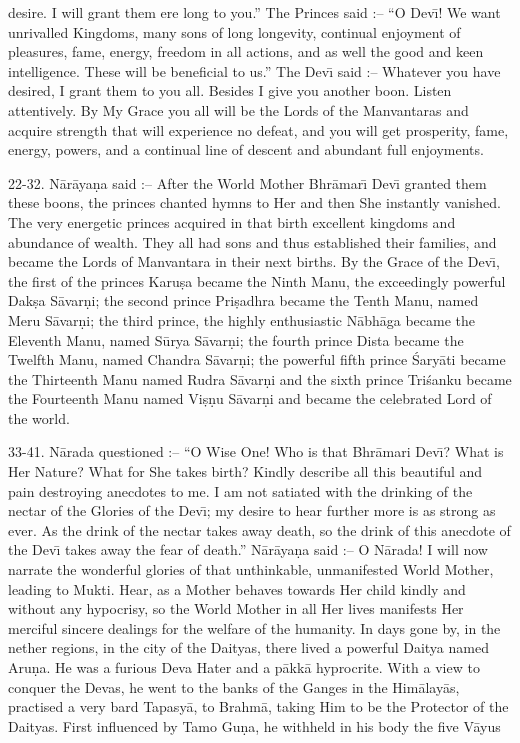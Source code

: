 desire. I will grant them ere long to you.'' The Princes said :-- ``O Dev\={\i}! We want unrivalled Kingdoms, many sons of long longevity, continual enjoyment of pleasures, fame, energy, freedom in all actions, and as well the good and keen intelligence. These will be beneficial to us.'' The Dev\={\i} said :-- Whatever you have desired, I grant them to you all. Besides I give you another boon. Listen attentively. By My Grace you all will be the Lords of the Manvantaras and acquire strength that will experience no defeat, and you will get prosperity, fame, energy, powers, and a continual line of descent and abundant full enjoyments.

22-32. N\=ar\=aya\d{n}a said :-- After the World Mother Bhr\=amar\={\i} Dev\={\i} granted them these boons, the princes chanted hymns to Her and then She instantly vanished. The very energetic princes acquired in that birth excellent kingdoms and abundance of wealth. They all had sons and thus established their families, and became the Lords of Manvantara in their next births. By the Grace of the Dev\={\i}, the first of the princes Karu\d{s}a became the Ninth Manu, the exceedingly powerful Dak\d{s}a S\=avar\d{n}i; the second prince Pri\d{s}adhra became the Tenth Manu, named Meru S\=avar\d{n}i; the third prince, the highly enthusiastic N\=abh\=aga became the Eleventh Manu, named S\=urya S\=avar\d{n}i; the fourth prince Dista became the Twelfth Manu, named Chandra S\=avar\d{n}i; the powerful fifth prince \'Sary\=ati became the Thirteenth Manu named Rudra S\=avar\d{n}i and the sixth prince Tri\'sanku became the Fourteenth Manu named Vi\d{s}\d{n}u S\=avar\d{n}i and became the celebrated Lord of the world.

33-41. N\=arada questioned :-- ``O Wise One! Who is that Bhr\=amari Dev\={\i}? What is Her Nature? What for She takes birth? Kindly describe all this beautiful and pain destroying anecdotes to me. I am not satiated with the drinking of the nectar of the Glories of the Dev\={\i}; my desire to hear further more is as strong as ever. As the drink of the nectar takes away death, so the drink of this anecdote of the Dev\={\i} takes away the fear of death.'' N\=ar\=aya\d{n}a said :-- O N\=arada! I will now narrate the wonderful glories of that unthinkable, unmanifested World Mother, leading to Mukti. Hear, as a Mother behaves towards Her child kindly and without any hypocrisy, so the World Mother in all Her lives manifests Her merciful sincere dealings for the welfare of the humanity. In days gone by, in the nether regions, in the city of the Daityas, there lived a powerful Daitya named Aru\d{n}a. He was a furious Deva Hater and a p\=akk\=a hyprocrite. With a view to conquer the Devas, he went to the banks of the Ganges in the Him\=alay\=as, practised a very bard Tapasy\=a, to Brahm\=a, taking Him to be the Protector of the Daityas. First influenced by Tamo Gu\d{n}a, he withheld in his body the five V\=ayus

